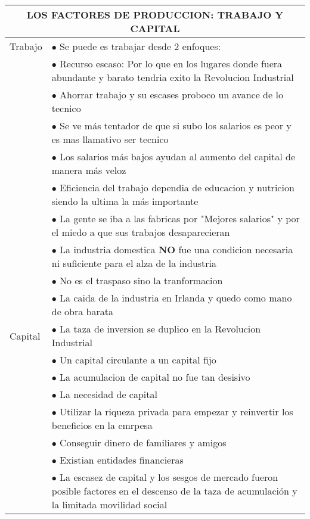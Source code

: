 \begingroup
\setlength{\tabcolsep}{12pt} %
\renewcommand{\arraystretch}{1.5} %
\begin{tabular}{p{3cm}|p{11cm}}
  \multicolumn{2}{c}{\large LOS FACTORES DE PRODUCCION: TRABAJO Y CAPITAL}                                                                         \\ \hline
  Trabajo & $\bullet$ Se puede es trabajar desde 2 enfoques:                                                                                       \\
          & \hspace{1cm} $\bullet$ Recurso escaso: Por lo que en los lugares donde fuera abundante y barato tendria exito la Revolucion Industrial \\
          & \hspace{1cm} $\bullet$ Ahorrar trabajo y su escases proboco un avance de lo tecnico                                                    \\
          & $\bullet$ Se ve más tentador de que si subo los salarios es peor y es mas llamativo ser tecnico                                        \\
          & $\bullet$ Los salarios más bajos ayudan al aumento del capital de manera más veloz                                                     \\
          & $\bullet$ Eficiencia del trabajo dependia de educacion y nutricion siendo la ultima la más importante                                  \\
          & $\bullet$ La gente se iba a las fabricas por "Mejores salarios" y por el miedo a que sus trabajos desaparecieran                       \\
          & $\bullet$ La industria domestica {\bf NO} fue una condicion necesaria ni suficiente para el alza de la industria\\
          & $\bullet$ No es el traspaso sino la tranformacion \\
          & $\bullet$ La caida de la industria en Irlanda y quedo como mano de obra barata\\\hline
Capital & $\bullet$ La taza de inversion se duplico en la Revolucion Industrial\\ 
& $\bullet$ Un capital circulante a un capital fijo\\
& $\bullet$ La acumulacion de capital no fue tan desisivo\\
& $\bullet$ La necesidad de capital\\ 
& \hspace{1cm} $\bullet$ Utilizar la riqueza privada para empezar y reinvertir los beneficios en la emrpesa\\        
& \hspace{1cm} $\bullet$ Conseguir dinero de familiares y amigos\\   
& \hspace{1cm} $\bullet$ Existian entidades financieras\\   
&$\bullet$ La escasez de capital y los sesgos de mercado fueron posible factores en el descenso de la taza de acumulación y la limitada movilidad social\\

\end{tabular}
\endgroup



